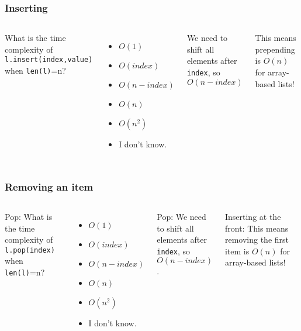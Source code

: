 \begin{frame}
	\frametitle{Inserting}
	\begin{columns}

			What is the time complexity of \texttt{l.insert(index,value)} when \texttt{len(l)}=n?
			
			\begin{itemize}
				\item $O(1)$
				\item $O(\textit{index})$
				\item $O(n - \textit{index})$
				\item $O(n)$
				\item $O(n^2)$
				\item I don't know.
			\end{itemize}
		
			We need to shift all elements after \texttt{index}, so $O(n-\textit{index})$
		
			This means prepending is $O(n)$ for array-based lists!
	\end{columns}
\end{frame}

\begin{frame}
	\frametitle{Removing an item}
	\begin{columns}
		\column{0.455\linewidth}
			Pop: What is the time complexity of \texttt{l.pop(index)} when \texttt{len(l)}=n?
			\begin{itemize}
				\item $O(1)$
				\item $O(\textit{index})$
				\item $O(n - \textit{index})$
				\item $O(n)$
				\item $O(n^2)$
				\item I don't know.
			\end{itemize}
		
		\column{0.455\linewidth}
			Pop: We need to shift all elements after \texttt{index}, so $O(n-\textit{index})$.
		
		Inserting at the front:
			This means removing the first item is $O(n)$ for array-based lists!
	\end{columns}
\end{frame}

